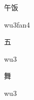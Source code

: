 \begin{multicols*}{2}
\begin{verbete}[wu3fan4]{午饭}
\begin{pronuncia}{wu3fan4}
\end{pronuncia}
\end{verbete}

\begin{verbete}[wu3]{五}
\begin{pronuncia}{wu3}
\end{pronuncia}
\end{verbete}

\begin{verbete}[wu3]{舞}
\begin{pronuncia}{wu3}
\end{pronuncia}
\end{verbete}

\end{multicols*}
